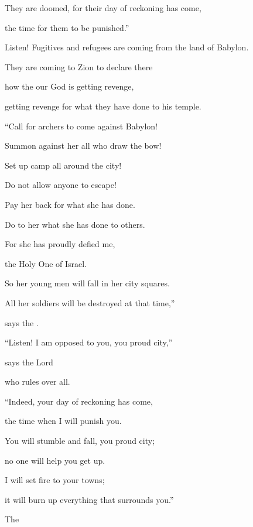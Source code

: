 {\par }{\Q They are doomed,
for
their day
of reckoning has come,
\par }{\Q the time
for them to be punished.”
\par }{\Q {}Listen! Fugitives
and refugees
are coming from the land
of Babylon.
\par }{\Q They are coming to Zion
to declare
there
\par }{\Q how the
{}
our God
is getting revenge,
\par }{\Q getting revenge
for what they have done to his temple.
\par }{\Q {}“Call
for archers
to
come against Babylon!
\par }{\Q Summon against her all
who draw
the bow!
\par }{\Q Set up camp
all around
the city!
\par }{\Q Do not
allow anyone
to escape!
\par }{\Q Pay
her back for what she has done.
\par }{\Q Do
to her what she has done
to others.
\par }{\Q For
she has proudly
defied me,
\par }{\Q the Holy One
of Israel.
\par }{\Q {}So
her young men
will fall
in her city squares.
\par }{\Q All
her soldiers
will be destroyed
at that time,”
\par }{\Q says
the {}.
\par }{\Q {}“Listen! I am opposed
to
you, you proud
city,”

\par }{\Q says
the Lord

{}
who rules over all.
\par }{\Q “Indeed,
your day
of reckoning has come,
\par }{\Q the time
when I will punish you.
\par }{\Q {}You will stumble
and fall,
you proud
city;
\par }{\Q no
one will help you get up.
\par }{\Q I will set
fire
to your towns;
\par }{\Q it will burn up
everything
that surrounds you.”
\par }{\Q {}The

}
